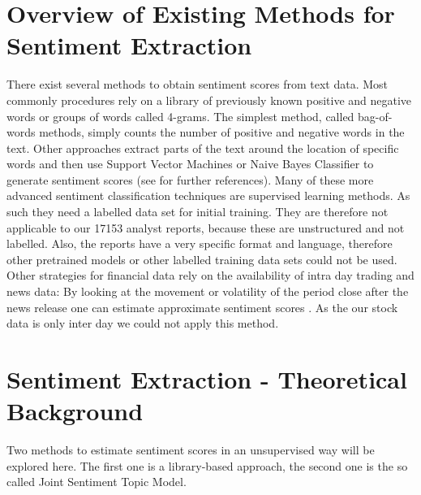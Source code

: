 \section{Overview of Existing Methods for Sentiment Extraction}
There exist several methods to obtain sentiment scores from text data. Most commonly procedures rely on a library of previously known positive and negative words or groups of words called 4-grams. The simplest method, called bag-of-words methods, simply counts the number of positive and negative words in the text. Other approaches extract parts of the text around the location of specific words and then use Support Vector Machines or Naive Bayes Classifier to generate sentiment scores (see \citet{westerski2007sentiment} for further references). Many of these more advanced sentiment classification techniques are supervised learning methods. As such they need a labelled data set for initial training. They are therefore not applicable to our 17153 analyst reports, because these are unstructured and not labelled. Also, the reports have a very specific format and language, therefore other pretrained models or other labelled training data sets could not be used. Other strategies for financial data rely on the availability of intra day trading and news data: By looking at the movement or volatility of the period close after the news release one can estimate approximate sentiment scores \citep{robertson2007news}. As the our stock data is only inter day we could not apply this method.
\\
\section{Sentiment Extraction - Theoretical Background}
Two methods to estimate sentiment scores in an unsupervised way will be explored here. The first one is a library-based approach, the second one is the so called Joint Sentiment Topic Model. 

